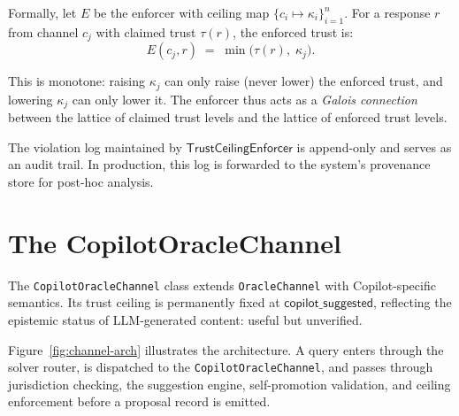 \documentclass[11pt]{article}
\newcommand{\CopChan}{\texttt{CopilotOracleChannel}}
\newcommand{\OChan}{\texttt{OracleChannel}}
\newcommand{\copilottrust}{$\mathsf{copilot\_suggested}$}
\begin{document}
Formally, let $E$ be the enforcer with ceiling map
$\{c_i \mapsto \kappa_i\}_{i=1}^{n}$.  For a response $r$ from
channel $c_j$ with claimed trust $\tau(r)$, the enforced trust is:
\begin{equation}\label{eq:enforced}
  E(c_j, r) \;=\; \min\bigl(\tau(r),\; \kappa_j\bigr).
\end{equation}

This is monotone: raising $\kappa_j$ can only raise (never lower)
the enforced trust, and lowering $\kappa_j$ can only lower it.  The
enforcer thus acts as a \emph{Galois connection} between the lattice
of claimed trust levels and the lattice of enforced trust levels.

\begin{remark}
The violation log maintained by $\mathsf{TrustCeilingEnforcer}$ is
append-only and serves as an audit trail.  In production, this log
is forwarded to the system's provenance store for post-hoc analysis.
\end{remark}


\section{The CopilotOracleChannel}\label{sec:channel}

The \CopChan{} class extends \OChan{} with Copilot-specific
semantics.  Its trust ceiling is permanently fixed at
\copilottrust{}, reflecting the epistemic status of LLM-generated
content: useful but unverified.

Figure~\ref{fig:channel-arch} illustrates the architecture.  A
query enters through the solver router, is dispatched to the
\CopChan{}, and passes through jurisdiction checking, the
suggestion engine, self-promotion validation, and ceiling
enforcement before a proposal record is emitted.
\end{document}
